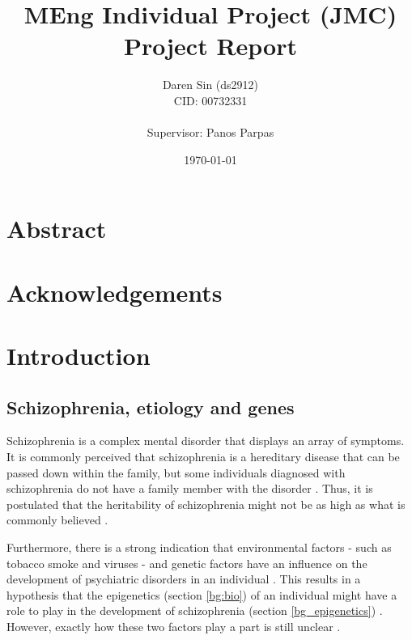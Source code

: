\documentclass[12pt, twoside, a4paper]{report}
\begin{document}
\title{MEng Individual Project (JMC) \\ Project Report}

\author{Daren Sin (ds2912) \\ CID: 00732331 \\ \\ Supervisor: Panos Parpas}

\date{\today}
\maketitle


\chapter*{Abstract}

\chapter*{Acknowledgements}

\tableofcontents

\newpage


\chapter{Introduction}


\section{Schizophrenia, etiology and genes}

Schizophrenia is a complex mental disorder that displays an array of symptoms. It is commonly perceived that schizophrenia is a hereditary disease that can be passed down within the family, but some individuals diagnosed with schizophrenia do not have a family member with the disorder \cite{RefWorks:8}. Thus, it is postulated that the heritability of schizophrenia might not be as high as what is commonly believed \cite{RefWorks:9}.

Furthermore, there is a strong indication that environmental factors - such as tobacco smoke and viruses - and genetic factors have an influence on the development of psychiatric disorders in an individual \cite{RefWorks:8, RefWorks:10}. This results in a hypothesis that the epigenetics (section \ref{bg:bio}) of an individual might have a role to play in the development of schizophrenia (section \ref{bg_epigenetics}) \cite{RefWorks:12}. However, exactly how these two factors play a part is still unclear \cite{RefWorks:11}.
\end{document}
